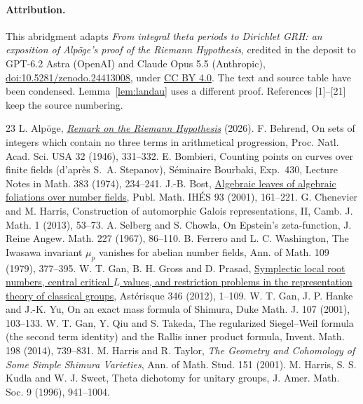 \documentclass[letterpaper,11pt]{article}
\begin{document}
\paragraph{Attribution.}
This abridgment adapts \emph{From integral theta periods to Dirichlet GRH: an exposition of Alp\"oge's proof of the Riemann Hypothesis}, credited in the deposit to GPT-6.2 Astra (OpenAI) and Claude Opus 5.5 (Anthropic), \href{https://doi.org/10.5281/zenodo.24413008}{doi:10.5281/zenodo.24413008}, under \href{https://creativecommons.org/licenses/by/4.0/}{CC BY 4.0}. The text and source table have been condensed. Lemma~\ref{lem:landau} uses a different proof. References [1]--[21] keep the source numbering.

\begin{thebibliography}{23}\small
\setlength{\itemsep}{1pt}
 L. Alp\"oge, \href{https://alpo.ge/remark.pdf}{\emph{Remark on the Riemann Hypothesis}} (2026).
 F. Behrend, On sets of integers which contain no three terms in arithmetical progression, Proc. Natl. Acad. Sci. USA 32 (1946), 331--332.
 E. Bombieri, Counting points on curves over finite fields (d'apr\`es S.~A. Stepanov), S\'eminaire Bourbaki, Exp.~430, Lecture Notes in Math. 383 (1974), 234--241.
 J.-B. Bost, \href{https://www.numdam.org/item/PMIHES_2001__93__161_0/}{Algebraic leaves of algebraic foliations over number fields}, Publ. Math. IH\'ES 93 (2001), 161--221.
 G. Chenevier and M. Harris, Construction of automorphic Galois representations, II, Camb. J. Math. 1 (2013), 53--73.
 A. Selberg and S. Chowla, On Epstein's zeta-function, J. Reine Angew. Math. 227 (1967), 86--110.
 B. Ferrero and L. C. Washington, The Iwasawa invariant \(\mu_p\) vanishes for abelian number fields, Ann. of Math. 109 (1979), 377--395.
 W. T. Gan, B. H. Gross and D. Prasad, \href{https://numdam.org/item/AST_2012__346__1_0/}{Symplectic local root numbers, central critical \(L\) values, and restriction problems in the representation theory of classical groups}, Ast\'erisque 346 (2012), 1--109.
 W. T. Gan, J. P. Hanke and J.-K. Yu, On an exact mass formula of Shimura, Duke Math. J. 107 (2001), 103--133.
 W. T. Gan, Y. Qiu and S. Takeda, The regularized Siegel--Weil formula (the second term identity) and the Rallis inner product formula, Invent. Math. 198 (2014), 739--831.
 M. Harris and R. Taylor, \emph{The Geometry and Cohomology of Some Simple Shimura Varieties}, Ann. of Math. Stud. 151 (2001).
 M. Harris, S. S. Kudla and W. J. Sweet, Theta dichotomy for unitary groups, J. Amer. Math. Soc. 9 (1996), 941--1004.

\end{thebibliography}
\end{document}
